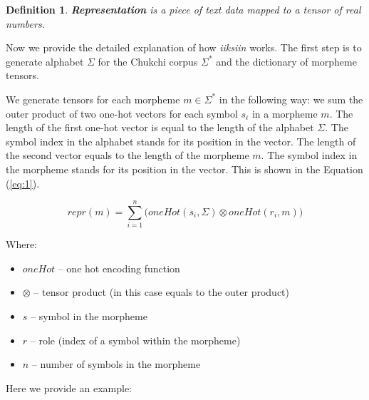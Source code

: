 \documentclass[leqno]{article}
\newtheorem{theorem}{Definition}
\begin{document}
\begin{theorem}
\textbf{Representation} is a piece of text data mapped to
a tensor of real numbers.
\end{theorem}

Now we provide the detailed explanation of how \textit{iiksiin} works. The first step is to generate alphabet $\Sigma$ for the Chukchi corpus $\Sigma^{*}$ and the dictionary of morpheme tensors.

We generate tensors for each morpheme $m \in \Sigma^*$ in the following way:
we sum the outer product of two one-hot vectors for each symbol $s_i$
in a morpheme $m$. The length of the first one-hot vector is equal to
the length of the alphabet $\Sigma$. The symbol index in the alphabet stands
for its position in the vector. The length of the second vector equals
to the length of the morpheme $m$. The symbol index in the morpheme stands
for its position in the vector. This is shown in the
Equation (\ref{eq:1}).

\begin{equation}\label{eq:1}
    repr(m) = \sum_{i=1}^{n}
    \bigg(oneHot(s_i, \Sigma) \otimes oneHot(r_i, m)\bigg)
\end{equation}

Where:

\begin{itemize}
    \item $oneHot$ -- one hot encoding function
    \item $\otimes$ -- tensor product (in this case equals to the outer product) 
    \item $s$ -- symbol in the morpheme
    \item $r$ -- role (index of a symbol within the morpheme)
    \item $n$ -- number of symbols in the morpheme
\end{itemize}

Here we provide an example:
\end{document}
